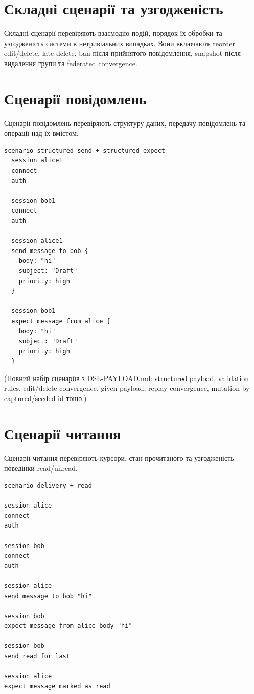 \documentclass{article}
\begin{document}
\section{Складні сценарії та узгодженість}

Складні сценарії перевіряють взаємодію подій, порядок їх обробки та узгодженість системи в нетривіальних випадках. Вони включають reorder edit/delete, late delete, ban після прийнятого повідомлення, snapshot після видалення групи та federated convergence.

\section{Сценарії повідомлень}

Сценарії повідомлень перевіряють структуру даних, передачу повідомлень та операції над їх вмістом.

\begin{lstlisting}[language={},basicstyle=\ttfamily\small]
scenario structured send + structured expect
  session alice1
  connect
  auth

  session bob1
  connect
  auth

  session alice1
  send message to bob {
    body: "hi"
    subject: "Draft"
    priority: high
  }

  session bob1
  expect message from alice {
    body: "hi"
    subject: "Draft"
    priority: high
  }
\end{lstlisting}

(Повний набір сценаріїв з DSL-PAYLOAD.md: structured payload, validation rules, edit/delete convergence, given payload, replay convergence, mutation by captured/seeded id тощо.)

\section{Сценарії читання}

Сценарії читання перевіряють курсори, стан прочитаного та узгодженість поведінки read/unread.

\begin{lstlisting}[language={},basicstyle=\ttfamily\small]
scenario delivery + read

session alice
connect
auth

session bob
connect
auth

session alice
send message to bob "hi"

session bob
expect message from alice body "hi"

session bob
send read for last

session alice
expect message marked as read
\end{lstlisting}
\end{document}

